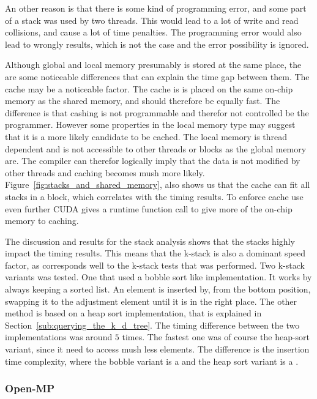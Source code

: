 An other reason is that there is some kind of programming error, and some part of a stack was used by two threads. This would lead to a lot of write and read collisions, and cause a lot of time penalties. The programming error would also lead to wrongly results, which is not the case and the error possibility is ignored.

Although global and local memory presumably is stored at the same place, the are some noticeable differences that can explain the time gap between them. The cache may be a noticeable factor. The cache is is placed on the same on-chip memory as the shared memory, and should therefore be equally fast. The difference is that cashing is not programmable and therefor not controlled be the programmer. However some properties in the local memory type may suggest that it is a more likely candidate to be cached.  The local memory is thread dependent and is not accessible to other threads or blocks as the global memory are. The compiler can therefor logically imply that the data is not modified by other threads and caching becomes mush more likely. Figure~\ref{fig:stacks_and_shared_memory}, also shows us that the cache can fit all stacks in a block, which correlates with the timing results. To enforce cache use even further CUDA gives a runtime function call to give more of the on-chip memory to caching.

The discussion and results for the stack analysis shows that the stacks highly impact the timing results. This means that the k-stack is also a dominant  speed factor, as corresponds well to the k-stack tests that was performed. Two k-stack variants was tested. One that used a bobble sort\cite{Cormen:2001} like implementation. It works by always keeping a sorted list. An element is inserted by, from the bottom position, swapping it to the adjustment element until it is in the right place. The other method is based on a heap sort implementation, that is explained in Section~\ref{sub:querying_the_k_d_tree}. The timing difference between the two implementations was around $5$ times. The fastest one was of course the heap-sort variant, since it need to access mush less elements. The difference is the insertion time complexity, where the bobble variant is a  and the heap sort variant is a .


\subsubsection{Open-MP} %
\label{ssub:open_mp_version}

